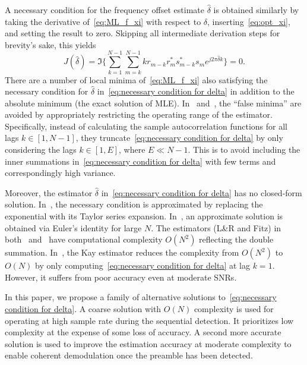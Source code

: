 A necessary condition for the frequency offset estimate $\hat{\delta}$
is obtained similarly by taking the derivative of~\eqref{eq:ML_f_xi} with respect to
$\delta$, inserting~\eqref{eq:opt_xi}, and setting the result to
zero.
Skipping all intermediate derivation steps for brevity's sake, this yields
\begin{equation}
  \label{eq:necessary condition for delta}
  J(\hat{\delta}) = \Im\bigg\{\sum_{k=1}^{N-1}{\sum_{m=k}^{N-1}{kr_{m-k}r_m^{*}s_{m-k}^{*}s_m}e^{j2\pi\hat{\delta}k}}\bigg\}=0.
\end{equation}
There are a number of local minima of~\eqref{eq:ML_f_xi} also satisfying
the necessary condition for $\hat{\delta}$ in~\eqref{eq:necessary condition for delta}
in addition to the absolute minimum (the exact solution of MLE).
In~\cite{Luise_Reggiannini_95} and~\cite{Fitz_94}, the ``false minima'' are avoided
by appropriately restricting the operating range of the estimator.
Specifically,
instead of calculating the sample autocorrelation functions for all
lags $k\in[1,N-1]$, 
they truncate~\eqref{eq:necessary condition for delta} by only considering the lags $k{\in}[1,E]$,
where $E \ll N{-}1$.
This is to avoid 
including the inner summations in~\eqref{eq:necessary condition for delta} with few
terms and correspondingly high variance.

Moreover, the estimator $\hat{\delta}$ in~\eqref{eq:necessary condition for delta} has no closed-form solution.
In~\cite{Luise_Reggiannini_95}, the necessary condition is
approximated by replacing the exponential with its Taylor series
expansion. 
In~\cite{Fitz_94}, an approximate solution is obtained via Euler's identity for large $N$.
The estimators (L\&R and Fitz) in both~\cite{Luise_Reggiannini_95} and~\cite{Fitz_94}  have computational complexity $O(N^2)$ 
reflecting the double summation.
In~\cite{kay_89}, the Kay estimator reduces the complexity from $O(N^2)$
to $O(N)$ by only
computing~\eqref{eq:necessary condition for delta} at lag $k=1$.
However, it suffers from poor accuracy even at moderate SNRs.

In this paper, we propose a family of alternative solutions to~\eqref{eq:necessary condition for delta}.
A coarse solution with $O(N)$ complexity is used for operating at high sample rate during the sequential detection.
It prioritizes low complexity at the expense of some loss of
accuracy.
A second more accurate solution is used to improve
the estimation accuracy at moderate complexity to enable coherent demodulation once the preamble has been detected. 

